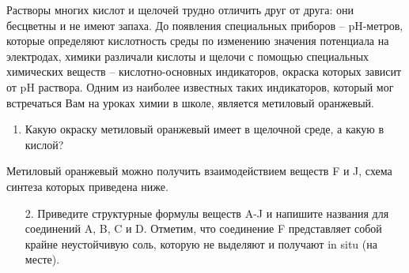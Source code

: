 
Растворы многих кислот и щелочей трудно отличить друг от друга: они бесцветны и не имеют запаха. До появления специальных приборов – pH-метров, которые определяют кислотность среды по изменению значения потенциала на электродах, химики различали кислоты и щелочи с помощью специальных химических веществ – кислотно-основных индикаторов, окраска которых зависит от pH раствора. Одним из наиболее известных таких индикаторов, который мог встречаться Вам на уроках химии в школе, является метиловый оранжевый.

\begin{enumerate}
    \item Какую окраску метиловый оранжевый имеет в щелочной среде, а какую в кислой?   
\end{enumerate}

Метиловый оранжевый можно получить взаимодействием веществ F и J, схема синтеза которых приведена ниже.

\begin{enumerate}
    \item[2.] Приведите структурные формулы веществ A-J и напишите названия для соединений A, B, C и D. Отметим, 
    что соединение F представляет собой  крайне неустойчивую соль, которую не выделяют и получают in 
    situ (на месте).
\end{enumerate}

